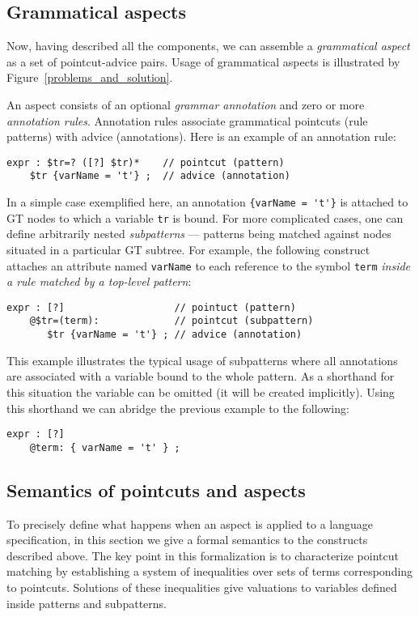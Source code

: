 \documentclass{IOS-Book-Article}     %
\newcommand{\figref}[1]{Figure~\ref{#1}}
\begin{document}
\subsection{Grammatical aspects}
Now, having described all the components, we can assemble a \emph{grammatical aspect} as a set of pointcut-advice pairs.
Usage of grammatical aspects is illustrated by \figref{problems_and_solution}.

An aspect consists of an optional \emph{grammar annotation} and zero or more \emph{annotation rules}. Annotation rules associate grammatical pointcuts (rule patterns) with advice (annotations). Here is an example of an annotation rule:
\begin{lstlisting}[language=Grammatic]
expr : $tr=? ([?] $tr)*    // pointcut (pattern)
    $tr {varName = 't'} ;  // advice (annotation)
\end{lstlisting}%
In a simple case exemplified here, an annotation \lstinline!{varName = 't'}! is attached to GT nodes to which a variable \texttt{tr} is bound.
For more complicated cases, one can define arbitrarily nested \emph{subpatterns} --- patterns being matched against nodes situated in a particular GT subtree. For example, the following construct attaches an attribute named \texttt{varName} to each reference to the symbol \texttt{term} \emph{inside a rule matched by a top-level pattern}:
\begin{lstlisting}[language=Grammatic]
expr : [?]                   // pointuct (pattern) 
    @$tr=(term):             // pointcut (subpattern)
       $tr {varName = 't'} ; // advice (annotation)
\end{lstlisting}
This example illustrates the typical usage of subpatterns where all annotations are associated with a variable bound to the whole pattern. As a shorthand for this situation the variable can be omitted (it will be created implicitly). Using this shorthand we can abridge the previous example to the following:
\begin{lstlisting}[language=Grammatic]
expr : [?]
    @term: { varName = 't' } ; 
\end{lstlisting}
%
\subsection{Semantics of pointcuts and aspects}

To precisely define what happens when an aspect is applied to a language specification, in this section we give a formal semantics to the constructs described above. The key point in this formalization is to characterize pointcut matching by establishing a system of inequalities over sets of terms corresponding to pointcuts. Solutions of these inequalities give valuations to variables defined inside patterns and subpatterns.
\end{document}
